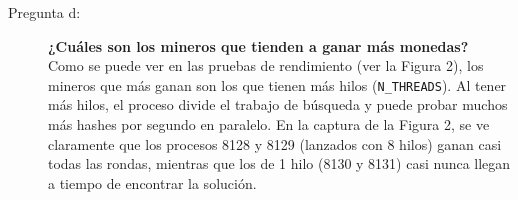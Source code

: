 \documentclass[11pt,a4paper]{article}
\begin{document}
\begin{description}
    \item[Pregunta d:] \textbf{¿Cuáles son los mineros que tienden a ganar más monedas?} \hfill \\
    Como se puede ver en las pruebas de rendimiento (ver la Figura 2), los mineros que más ganan son los que tienen más hilos (\texttt{N\_THREADS}). 
    Al tener más hilos, el proceso divide el trabajo de búsqueda y puede probar muchos más hashes por segundo en paralelo. En la captura de la Figura 2, 
    se ve claramente que los procesos 8128 y 8129 (lanzados con 8 hilos) ganan casi todas las rondas, mientras que los de 1 hilo (8130 y 8131) casi nunca 
    llegan a tiempo de encontrar la solución.
\end{description}
\end{document}
